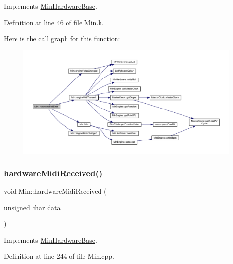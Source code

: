 Implements \hyperlink{class_min_hardware_base_ab65fc29881bb7dea6273c0753ad5d7dd}{Min\+Hardware\+Base}.



Definition at line 46 of file Min.\+h.

Here is the call graph for this function\+:
\nopagebreak
\begin{figure}[H]
\begin{center}
\leavevmode
\includegraphics[width=350pt]{dd/d34/class_min_a854b62697ad910d3bb0536fe7fd3d725_cgraph}
\end{center}
\end{figure}
\mbox{\label{class_min_a8d4ebe4e020e14c2457d42f33c4c9e32}} 
\subsubsection{\texorpdfstring{hardware\+Midi\+Received()}{hardwareMidiReceived()}}
{\footnotesize\ttfamily void Min\+::hardware\+Midi\+Received (\begin{DoxyParamCaption}\item[{unsigned char}]{data }\end{DoxyParamCaption})\hspace{0.3cm}{\ttfamily [virtual]}}



Implements \hyperlink{class_min_hardware_base_a8dc8c84b39b7b80d4a3c7e7fce017f2a}{Min\+Hardware\+Base}.



Definition at line 244 of file Min.\+cpp.

